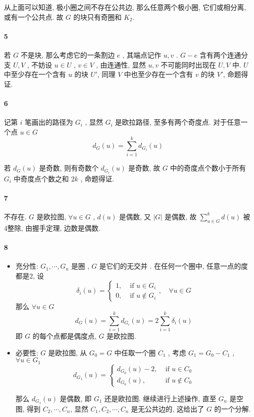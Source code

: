 \documentclass[a4paper, UTF8]{ctexart}				%
\numberwithin{equation}{section}				%
\begin{document}
        从上面可以知道, 极小圈之间不存在公共边, 那么任意两个极小圈, 它们或相分离, 或有一个公共点. 故 $G$ 的块只有奇圈和 $K_2$.
    \paragraph{5}\quad 
        若 $G$ 不是块, 那么考虑它的一条割边 $e$ , 其端点记作 $u , v$ .
        $G - e$ 含有两个连通分支 $U, V$ , 不妨设 $u \in U$ , $v \in V$ ,
        由连通性, 显然 $u, v$ 不可能同时出现在 $U, V$ 中.
        $U$ 中至少存在一个含有 $u$ 的块 $U'$, 同理 $V$ 中也至少存在一个含有 $v$ 的块 $V'$, 命题得证.
    \paragraph{6}\quad 
        记第 $i$ 笔画出的路径为 $G_i$ , 显然 $G_i$ 是欧拉路径, 至多有两个奇度点.
        对于任意一个点 $u \in G$
        $$d_G(u) = \sum_{i = 1}^k d_{G_i}(u)$$

        若 $d_G(u)$ 是奇数, 则有奇数个 $d_{G_i}(u)$ 是奇数, 故 $G$ 中的奇度点个数小于所有 $G_i$ 中奇度点个数之和 $2k$ , 命题得证.
    \paragraph{7}\quad 
        不存在. $G$ 是欧拉图, $\forall u \in G$ , $d(u)$ 是偶数, 又 $\vert{G}\vert$ 是偶数, 故 $\sum_{u \in G}^k d(u)$ 被4整除, 由握手定理, 边数是偶数.
    \paragraph{8}\quad
        \begin{itemize}
            \item 充分性: $G_1, \cdots, G_n$ 是圈 , $G$ 是它们的无交并 . 在任何一个圈中, 任意一点的度都是2, 设 
            $$\delta_i(u) = 
            \begin{cases}
                1, &\text{ if }u \in G_i\\
                0, &\text{ if }u \notin G_i
            \end{cases} , \quad \forall u \in G$$ 
            那么 $\forall u \in G$
            $$d_G(u) = \sum_{i = 1}^k d_{G_i}(u) = 2 \sum_{i = 1}^k \delta_i(u)$$
            即 $G$ 的每个点都是偶度点, $G$ 是欧拉图.

            \item 必要性: $G$ 是欧拉图, 从 $G_0 = G$ 中任取一个圈 $C_1$ , 考虑 $G_1 = G_0 - C_1$ , $\forall u \in G_1$
            $$d_{G_1}(u) = 
            \begin{cases}
                d_{G_0} (u) - 2, &\text{ if }u \in C_0\\
                d_{G_0} (u), &\text{ if }u \notin C_0
            \end{cases}$$

            那么 $d_{G_1}(u)$ 是偶数, 即 $G_1$ 还是欧拉图. 继续进行上述操作, 直至 $G_n$ 是空图, 得到 $C_2, \cdots, C_n$, 显然 $C_1, C_2, \cdots, C_n$ 是无公共边的, 这给出了 $G$ 的一个分解.
        \end{itemize}
\end{document}
